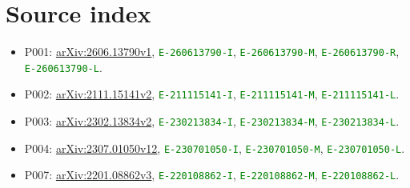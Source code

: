 \documentclass[10pt]{article}
\newcommand{\eid}[1]{\textcolor{green}{\texttt{#1}}}
\begin{document}
\section{Source index}

\begin{itemize}
\item P001: \href{https://arxiv.org/abs/2606.13790}{arXiv:2606.13790v1},
  \eid{E-260613790-I}, \eid{E-260613790-M},
  \eid{E-260613790-R}, \eid{E-260613790-L}.
\item P002: \href{https://arxiv.org/abs/2111.15141}{arXiv:2111.15141v2},
  \eid{E-211115141-I}, \eid{E-211115141-M}, \eid{E-211115141-L}.
\item P003: \href{https://arxiv.org/abs/2302.13834}{arXiv:2302.13834v2},
  \eid{E-230213834-I}, \eid{E-230213834-M}, \eid{E-230213834-L}.
\item P004: \href{https://arxiv.org/abs/2307.01050}{arXiv:2307.01050v12},
  \eid{E-230701050-I}, \eid{E-230701050-M}, \eid{E-230701050-L}.
\item P007: \href{https://arxiv.org/abs/2201.08862}{arXiv:2201.08862v3},
  \eid{E-220108862-I}, \eid{E-220108862-M}, \eid{E-220108862-L}.
\end{itemize}
\end{document}
